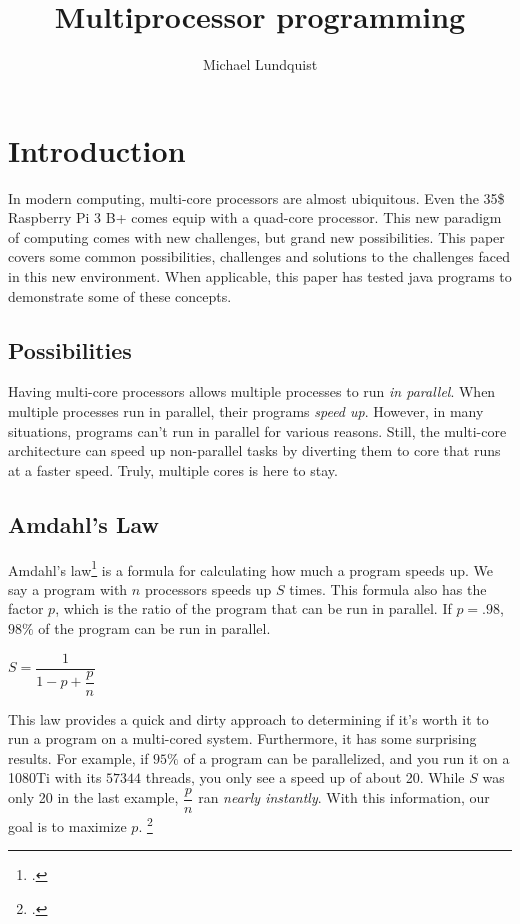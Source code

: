 \documentclass[titlepage]{article}
\author{Michael Lundquist}
\title{Multiprocessor programming}
\begin{document}
\maketitle


\section{Introduction}

In modern computing, multi-core processors are almost ubiquitous. Even the 35\$ Raspberry Pi 3 B+ comes equip with a quad-core processor. This new paradigm of computing comes with new challenges, but grand new possibilities. This paper covers some common possibilities, challenges and solutions to the challenges faced in this new environment. When applicable, this paper has tested java programs to demonstrate some of these concepts.

\subsection{Possibilities}

Having multi-core processors allows multiple processes to run \textit{in parallel}. When multiple processes run in parallel, their programs \textit{speed up}. However, in many situations, programs can't run in parallel for various reasons. Still, the multi-core architecture can speed up non-parallel tasks by diverting them to core that runs at a faster speed. Truly, multiple cores is here to stay.

\subsection{Amdahl's Law}

Amdahl's law\footcite[the cited paper is the law's origin]{Amdahl:1967:VSP:1465482.1465560} is a formula for calculating how much a program speeds up. We say a program with $n$ processors speeds up $S$ times. This formula also has the factor $p$, which is the ratio of the program that can be run in parallel. If $p =.98$, $98\%$ of the program can be run in parallel.

$S = \dfrac 1 {1 - p + \dfrac p n}$

This law provides a quick and dirty approach to determining if it's worth it to run a program on a multi-cored system. Furthermore, it has some surprising results. For example, if $95\%$ of a program can be parallelized, and you run it on a 1080Ti with its $57344$ threads, you only see a speed up of about 20. While $S$ was only 20 in the last example, $\dfrac p n$ ran \textit{nearly instantly}. With this information, our goal is to maximize $p$. \footcite[Stackoverflow user, djna, helps another user, Monster, maximize $p$]{stack:xxx}
\end{document}

